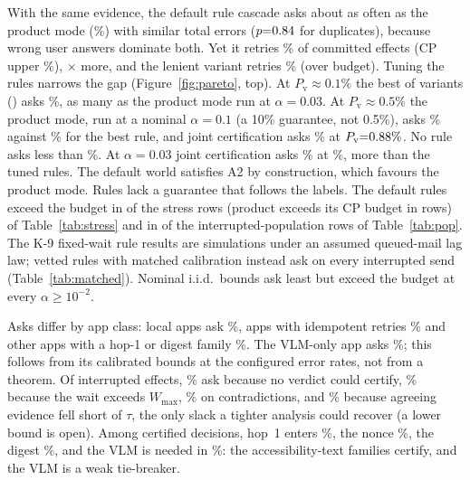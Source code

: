 With the same evidence, the default rule cascade asks about as often as the product mode (\SimRulesAsk\%) with similar total errors
($p{=}0.84$ for duplicates), because wrong user answers dominate both. Yet it retries \SimRulesPv\% of committed effects (CP upper \SimRulesPvHi\%), \SimRulesRatio$\times$
more, and the lenient variant retries \SimRulesLenPv\% (over budget). Tuning the rules narrows the gap (Figure~\ref{fig:pareto}, top). At $P_{\mathrm{v}}\approx0.1\%$ the best of
\RuleN{} variants (\RuleBestThreeName) asks \RuleBestThreeAsk\%, as many as the product mode run at $\alpha{=}0.03$. At $P_{\mathrm{v}}\approx0.5\%$ the product mode, run at a
nominal $\alpha{=}0.1$ (a 10\% guarantee, not 0.5\%), asks \SweepTenAsk\% against \RuleBestTenAsk\% for the best rule, and joint certification asks \SweepJointTenAsk\% at
$P_{\mathrm{v}}{=}0.88\%$. No rule asks less than \RuleMinAsk\%. At $\alpha{=}0.03$ joint certification asks \SweepJointThreeAsk\% at \SweepJointThreePv\%,
more than the tuned rules. The default world satisfies A2 by construction, which favours the product mode. Rules lack a guarantee that follows the labels. The default
rules exceed the budget in \StressRulesOver{} of the stress rows (product exceeds its CP budget in \StressNover{} rows) of Table~\ref{tab:stress} and in \PopRulesOver{} of the \PopRows{} interrupted-population rows of Table~\ref{tab:pop}.
The K-9 fixed-wait rule results are simulations under an assumed queued-mail lag law; vetted rules with matched calibration instead ask on every interrupted send (Table~\ref{tab:matched}). Nominal i.i.d.\ bounds ask least but exceed the budget at every $\alpha\ge10^{-2}$.



Asks differ by app class: local apps ask \ClassLocalAsk\%, apps with idempotent retries \ClassGtwoAsk\% and other apps with a hop-1 or digest family
\ClassNonGtwoAsk\%. The VLM-only app asks \ClassVlmAsk\%; this follows from its calibrated bounds at the configured error rates, not from a theorem. Of interrupted effects, \WhyStruct\% ask because no verdict could certify, \WhyWait\% because the wait exceeds $W_{\max}$, \WhyContra\% on contradictions, and
\WhyUncert\% because agreeing evidence fell short of $\tau$, the only slack a tighter analysis could recover (a lower bound is open). Among certified decisions, hop~1 enters \ShareHop\%, the nonce \ShareNonce\%, the digest \ShareDigest\%, and the VLM is needed in
\ShareVlm\%: the accessibility-text families certify, and the VLM is a weak tie-breaker.

